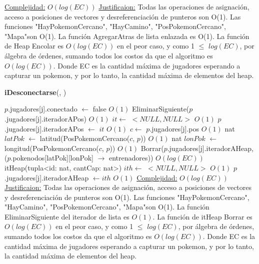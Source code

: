\begin{Algoritmos}
\begin{algorithm}[H]
\begin{algorithmic}[1]
\medskip
\State \underline{Complejidad:} $O(log(EC))$ 
\State \underline{Justificaion:} Todas las operaciones de asignaci\'on, acceso a posiciones de vectores y desreferenciaci\'on de punteros son O(1). Las funciones "HayPokemonCercano", "HayCamino", "PosPokemonCercano", "Mapa"\hspace{0.5mm}son O(1). La funci\'on AgregarAtras de lista enlazada es O(1). La funci\'on de Heap Encolar es $O(log(EC))$ en el peor caso, y como 1 $\leq$ $log(EC)$, por \'algebra de \'ordenes, sumando todos los costos da que el algoritmo es $O(log(EC))$. Donde EC es la cantidad m\'axima de jugadores esperando a capturar un pokemon, y por lo tanto, la cantidad m\'axima de elementos del heap.


\end{algorithmic}
\end{algorithm}

\begin{algorithm}[H]
{\textbf{iDesconectarse}(, )}
\begin{algorithmic}[1]

\State $p$.jugadores[\hspace{0.5mm}j\hspace{0.5mm}].conectado $\gets$ false \Comment $O(1)$
\State EliminarSiguiente($p$.jugadores[j].iteradorAPos) \Comment $O(1)$
\State $it \gets$ $<NULL, NULL>$ \Comment $O(1)$
\State $p$.jugadores[j].iteradorAPos $\gets$ $it$ \Comment $O(1)$
\State $c \gets$ $p$.jugadores[j].pos 
 \Comment $O(1)$
    \State nat $latPok$ $\gets$ latitud(PosPokemonCercano($c$, $p$)) \Comment $O(1)$
    \State nat $lonPok$ $\gets$ longitud(PosPokemonCercano($c$, $p$)) \Comment $O(1)$
    \State Borrar($p$.jugadores[j].iteradorAHeap, ($p$.pokenodos[latPok][lonPok] $\rightarrow$ entrenadores)) \Comment $O(log(EC))$
    \State itHeap(tupla<id: nat, cantCap: nat>) $ith \gets$ $<NULL, NULL>$ \Comment $O(1)$
    \State $p$.jugadores[j].iteradorAHeap $\gets ith$ \Comment $O(1)$
\EndIf
\medskip
\State \underline{Complejidad:} $O(log(EC))$ 
\State \underline{Justificaion:} Todas las operaciones de asignaci\'on, acceso a posiciones de vectores y desreferenciaci\'on de punteros son O(1). Las funciones "HayPokemonCercano", "HayCamino", "PosPokemonCercano", "Mapa"\hspace{0.5mm}son O(1). La funci\'on EliminarSiguiente del iterador de lista es $O(1)$. La funci\'on de itHeap Borrar es $O(log(EC))$ en el peor caso, y como 1 $\leq$ $log(EC)$, por \'algebra de \'ordenes, sumando todos los costos da que el algoritmo es $O(log(EC))$. Donde EC es la cantidad m\'axima de jugadores esperando a capturar un pokemon, y por lo tanto, la cantidad m\'axima de elementos del heap.



\end{algorithmic}
\end{algorithm}
\end{Algoritmos}
